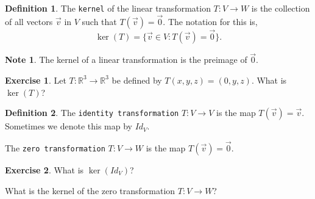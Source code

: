 \documentclass{beamer}
\newcommand{\R}{\mathbb{R}}
\newcommand{\fn}{\insertframenumber}
\theoremstyle{definition}
\newtheorem{exercise}{Exercise}
\newtheorem*{defn}{Definition}
\newtheorem*{nb}{Note}
\renewcommand{\emph}[1]{{\color{blue}\texttt{#1}}}
\begin{document}
\begin{frame}{\fn}
	\begin{defn}
		The \emph{kernel} of the linear transformation $T\colon V\to W$ is the collection of all vectors $\vec v$ in $V$ such that $T(\vec v)=\vec 0$.  The notation for this is,	\[\ker(T)=\{\vec v\in V: T(\vec v)=\vec 0\}.\]
	\end{defn}
	\begin{nb}
		The kernel of a linear transformation is the preimage of $\vec 0$.
	\end{nb}
	\begin{exercise}
		Let $T\colon \R^3\to\R^3$ be defined by $T(x,y,z)=(0,y,z)$.  What is $\ker(T)$?
	\end{exercise}
\end{frame}
\begin{frame}{\fn}
	\begin{defn}
		The \emph{identity transformation} $T\colon V\to V$ is the map $T(\vec v)=\vec v$.  Sometimes we denote this map by $Id_V$.
		
		The \emph{zero transformation} $T\colon V\to W$ is the map $T(\vec v)=\vec 0$.
	\end{defn}
	\begin{exercise}
		What is $\ker(Id_V)$?
		
		What is the kernel of the zero transformation $T\colon V\to W$?
	\end{exercise}
\end{frame}
\end{document}
